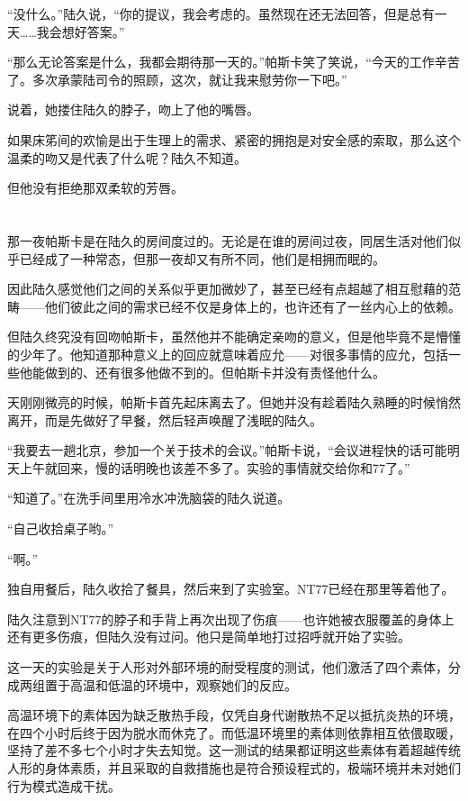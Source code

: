 “没什么。”陆久说，“你的提议，我会考虑的。虽然现在还无法回答，但是总有一天……我会想好答案。”

“那么无论答案是什么，我都会期待那一天的。”帕斯卡笑了笑说，“今天的工作辛苦了。多次承蒙陆司令的照顾，这次，就让我来慰劳你一下吧。”

说着，她搂住陆久的脖子，吻上了他的嘴唇。

如果床笫间的欢愉是出于生理上的需求、紧密的拥抱是对安全感的索取，那么这个温柔的吻又是代表了什么呢？陆久不知道。

但他没有拒绝那双柔软的芳唇。\section*{}

那一夜帕斯卡是在陆久的房间度过的。无论是在谁的房间过夜，同居生活对他们似乎已经成了一种常态，但那一夜却又有所不同，他们是相拥而眠的。

因此陆久感觉他们之间的关系似乎更加微妙了，甚至已经有点超越了相互慰藉的范畴——他们彼此之间的需求已经不仅是身体上的，也许还有了一丝内心上的依赖。

但陆久终究没有回吻帕斯卡，虽然他并不能确定亲吻的意义，但是他毕竟不是懵懂的少年了。他知道那种意义上的回应就意味着应允——对很多事情的应允，包括一些他能做到的、还有很多他做不到的。但帕斯卡并没有责怪他什么。

天刚刚微亮的时候，帕斯卡首先起床离去了。但她并没有趁着陆久熟睡的时候悄然离开，而是先做好了早餐，然后轻声唤醒了浅眠的陆久。

“我要去一趟北京，参加一个关于技术的会议。”帕斯卡说，“会议进程快的话可能明天上午就回来，慢的话明晚也该差不多了。实验的事情就交给你和77了。”

“知道了。”在洗手间里用冷水冲洗脑袋的陆久说道。

“自己收拾桌子哟。”

“啊。”

独自用餐后，陆久收拾了餐具，然后来到了实验室。NT77已经在那里等着他了。

陆久注意到NT77的脖子和手背上再次出现了伤痕——也许她被衣服覆盖的身体上还有更多伤痕，但陆久没有过问。他只是简单地打过招呼就开始了实验。

这一天的实验是关于人形对外部环境的耐受程度的测试，他们激活了四个素体，分成两组置于高温和低温的环境中，观察她们的反应。

高温环境下的素体因为缺乏散热手段，仅凭自身代谢散热不足以抵抗炎热的环境，在四个小时后终于因为脱水而休克了。而低温环境里的素体则依靠相互依偎取暖，坚持了差不多七个小时才失去知觉。这一测试的结果都证明这些素体有着超越传统人形的身体素质，并且采取的自救措施也是符合预设程式的，极端环境并未对她们行为模式造成干扰。

